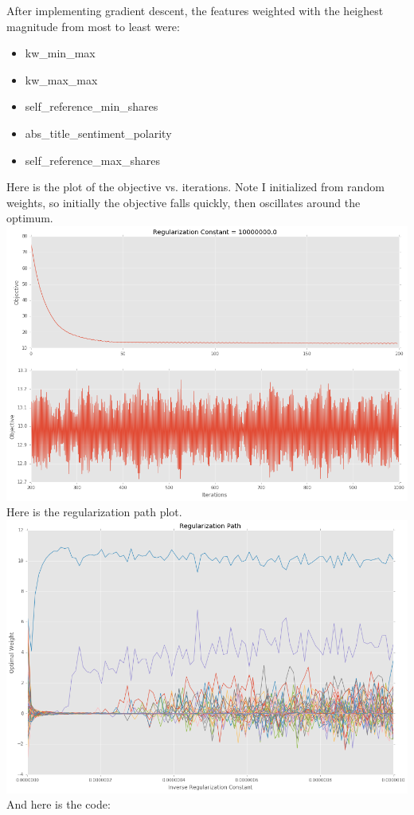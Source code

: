 \documentclass[12pt,letterpaper,fleqn]{hmcpset}
\begin{document}
\begin{solution}
    After implementing gradient descent, the features weighted with the heighest magnitude from most to least were:
    \begin{itemize}
        \item 
        kw\_min\_max 
        \item 
        kw\_max\_max 
        \item 
        self\_reference\_min\_shares 
        \item 
        abs\_title\_sentiment\_polarity 
        \item 
        self\_reference\_max\_shares 
    \end{itemize}
    Here is the plot of the objective vs. iterations. Note I initialized from random weights, so initially the objective falls quickly, then oscillates around the optimum. \\
    \includegraphics[scale = .5]{objectiveViterations2.png} \\
    Here is the regularization path plot. \\
    \includegraphics[scale = .5]{regpath.png} \\
    And here is the code: \\
    
    
\end{solution}
\end{document}
